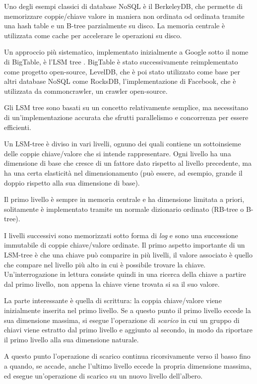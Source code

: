 Uno degli esempi classici di database NoSQL è il BerkeleyDB, che permette di memorizzare coppie/chiave valore in maniera non ordinata od ordinata tramite una hash table e un B-tree parzialmente su disco. La memoria centrale è utilizzata come cache per accelerare le operazioni su disco.

Un approccio più sistematico, implementato inizialmente a Google sotto il nome di BigTable, è l'LSM tree \cite{bigTable}.
BigTable è stato successivamente reimplementato come progetto open-source, LevelDB, che è poi stato utilizzato come base per altri database NoSQL come RocksDB, l'implementazione di Facebook, che è utilizzata da commoncrawler, un crawler open-source.

Gli LSM tree sono basati su un concetto relativamente semplice, ma necessitano di un'implementazione accurata che sfrutti parallelismo e concorrenza per essere efficienti.

Un LSM-tree è diviso in vari livelli, ognuno dei quali contiene un sottoinsieme delle coppie chiave/valore che si intende rappresentare. Ogni livello ha una dimensione di base che cresce di un fattore dato rispetto al livello precedente, ma ha una certa elasticità nel dimensionamento (può essere, ad esempio, grande il doppio rispetto alla sua dimensione di base).

Il primo livello è sempre in memoria centrale e ha dimensione limitata a priori, solitamente è implementato tramite un normale dizionario ordinato (RB-tree o B-tree).

I livelli successivi sono memorizzati sotto forma di \textit{log} e sono una successione immutabile di coppie chiave/valore ordinate.
Il primo aspetto importante di un LSM-tree è che una chiave può comparire in più livelli, il valore associato è quello che compare nel livello più alto in cui è possibile trovare la chiave. Un'interrogazione in lettura consiste quindi in una ricerca della chiave a partire dal primo livello, non appena la chiave viene trovata si sa il suo valore.

La parte interessante è quella di scrittura: la coppia chiave/valore viene inizialmente inserita nel primo livello. Se a questo punto il primo livello eccede la sua dimensione massima, si esegue l'operazione di \textit{scarico} in cui un gruppo di chiavi viene estratto dal primo livello e aggiunto al secondo, in modo da riportare il primo livello alla sua dimensione naturale.

A questo punto l'operazione di scarico continua ricorsivamente verso il basso fino a quando, se accade, anche l'ultimo livello eccede la propria dimensione massima, ed esegue un'operazione di scarico su un nuovo livello dell'albero.

